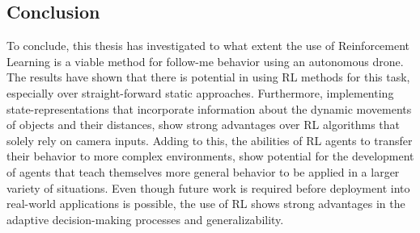 \subsection{Conclusion}
To conclude, this thesis has investigated to what extent the use of Reinforcement Learning
is a viable method for follow-me behavior using an autonomous drone. The 
results have shown that there is potential in using RL methods for this task, especially 
over straight-forward static approaches. Furthermore, implementing state-representations 
that incorporate information about the dynamic movements of objects and their distances, 
show strong advantages over RL algorithms that solely rely on camera inputs. Adding to 
this, the abilities of RL agents to transfer their behavior to more complex environments, show 
potential for the development of agents that teach themselves more general behavior to be 
applied in a larger variety of situations. Even though 
future work is required before deployment into real-world applications is possible, 
the use of RL shows strong advantages in the adaptive decision-making processes and generalizability. 